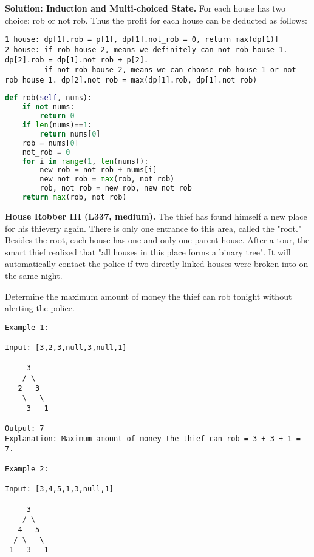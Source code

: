 \documentclass[../main.tex]{subfiles}
\begin{document}
\begin{examples}
\textbf{Solution: Induction and Multi-choiced State.} For each house has two choice:  rob or not rob. Thus the profit for each house can be deducted as follows: 
\begin{lstlisting}[numbers=none]
1 house: dp[1].rob = p[1], dp[1].not_rob = 0, return max(dp[1)]
2 house: if rob house 2, means we definitely can not rob house 1. dp[2].rob = dp[1].not_rob + p[2].
         if not rob house 2, means we can choose rob house 1 or not rob house 1. dp[2].not_rob = max(dp[1].rob, dp[1].not_rob)
\end{lstlisting}
\begin{lstlisting}[language = Python]
def rob(self, nums):
    if not nums:
        return 0
    if len(nums)==1:
        return nums[0]
    rob = nums[0]
    not_rob = 0
    for i in range(1, len(nums)):
        new_rob = not_rob + nums[i]
        new_not_rob = max(rob, not_rob)
        rob, not_rob = new_rob, new_not_rob
    return max(rob, not_rob)
\end{lstlisting}
\item \textbf{House Robber III (L337, medium).} The thief has found himself a new place for his thievery again. There is only one entrance to this area, called the "root." Besides the root, each house has one and only one parent house. After a tour, the smart thief realized that "all houses in this place forms a binary tree". It will automatically contact the police if two directly-linked houses were broken into on the same night.

Determine the maximum amount of money the thief can rob tonight without alerting the police.
\begin{lstlisting}[numbers=none]
Example 1:

Input: [3,2,3,null,3,null,1]

     3
    / \
   2   3
    \   \ 
     3   1

Output: 7 
Explanation: Maximum amount of money the thief can rob = 3 + 3 + 1 = 7.

Example 2:

Input: [3,4,5,1,3,null,1]

     3
    / \
   4   5
  / \   \ 
 1   3   1


\end{lstlisting}
\end{examples}
\end{document}
